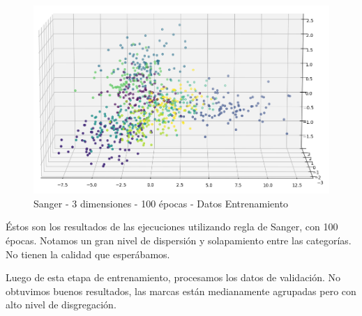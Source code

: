 \begin{figure}[h]
  \begin{center}
    \includegraphics[scale=0.45]{../img/ej1/sanger/sanger_3salida_100ep_train_2.png}
  \caption{Sanger - 3 dimensiones - 100 épocas - Datos Entrenamiento}
  \end{center}
\end{figure}

Éstos son los resultados de las ejecuciones utilizando regla de Sanger, con 100 épocas. Notamos un gran nivel de dispersión y 
solapamiento entre las categorías. No tienen la calidad que esperábamos.

Luego de esta etapa de entrenamiento, procesamos los datos de validación. No obtuvimos buenos resultados, las marcas están 
medianamente agrupadas pero con alto nivel de disgregación.

